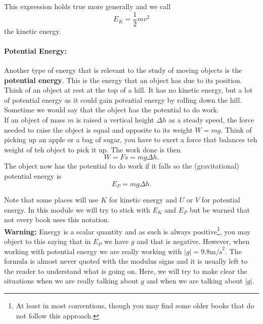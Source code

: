 \documentclass[a4paper,12pt]{book}
\begin{document}
This expression holds true more generally and we call 
\begin{equation}
E_{K}=\frac{1}{2}mv^{2}
\label{eq: kinetic energy}
\end{equation}
the kinetic energy.

%
\paragraph{Potential Energy:}  Another type of energy that is relevant to the study of moving objects is the \textbf{potential energy}. This is the energy that an object has due to its position. Think of an object at rest at the top of a hill. It has no kinetic energy, but a lot of potential energy as it could gain potential energy by rolling down the hill. Sometime we would say that the object has the potential to do work.\\

If an object of mass $m$ is raised a vertical height $\Delta h$ as a steady speed, the force needed to raise the object is equal and opposite to its weight $W=mg$. Think of picking up an apple or a bag of sugar, you have to exert a force that balances teh weight of teh object to pick it up. The work done is then
\begin{equation*}
W=Fs=mg\Delta h.
\end{equation*}
The object now has the potential to do work if it falls so the (gravitational) potential energy is 
\begin{equation}
E_{P}=mg\Delta h.
\label{eq: potential energy}
\end{equation}

Note that some places will use $K$ for   kinetic energy and $U$ or $V$ for potential energy. In this module we will try to stick with $E_{K}$ and $E_{P}$ but be warned that not every book uses this notation.\\

\textbf{Warning:} Energy is a scalar quantity and as such is always positive\footnote{At least in most conventions, though you may find some older books that do not follow this approach.}, you may object to this saying that in $E_{P}$ we have $g$ and that is negative. However, when working with potential energy we are really working with $\vert g\vert =9.8\text{m/s}^{2}$. The formula is almost never quoted with the modulus signs and it is usually left to the reader to understand what is going on. Here, we will try to make clear the situations when we are really talking about $g$ and when we are talking about $\vert g\vert$.\\
\end{document}
